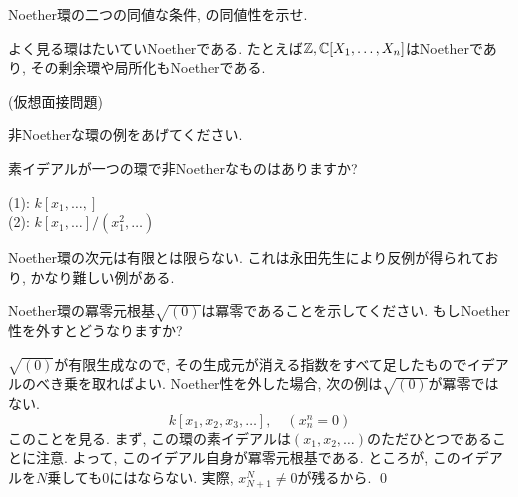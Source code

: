 \begin{prac}
Noether環の二つの同値な条件, の同値性を示せ.
\end{prac}

\begin{eg}
よく見る環はたいていNoetherである. たとえば$\mathbb{Z}, \mathbb{C}[X_1,\dots,X_n]$はNoetherであり, その剰余環や局所化もNoetherである.
\end{eg}

\begin{egprob} (仮想面接問題)
\ben
\item 非Noetherな環の例をあげてください.
\item 素イデアルが一つの環で非Noetherなものはありますか?
\een
\end{egprob}
\begin{egans}
(1): $k[x_1,\dots, ]$ \\
(2): $k[x_1,\dots]/(x_1^2,\dots)$
\end{egans}


\begin{rem}
Noether環の次元は有限とは限らない.  これは永田先生により反例が得られており, かなり難しい例がある.
\end{rem}

\begin{egprob}
Noether環の冪零元根基$\sqrt{(0)}$は冪零であることを示してください. もしNoether性を外すとどうなりますか?
\end{egprob}
\begin{egans}
$\sqrt{(0)}$が有限生成なので, その生成元が消える指数をすべて足したものでイデアルのべき乗を取ればよい. Noether性を外した場合, 次の例は$\sqrt{(0)}$が冪零ではない.
\[k[x_1,x_2,x_3,\dots],\quad (x_n^{n} = 0)\]
このことを見る. まず, この環の素イデアルは$(x_1,x_2,\dots)$のただひとつであることに注意. よって, このイデアル自身が冪零元根基である. ところが, このイデアルを$N$乗しても0にはならない. 実際, $x_{N+1}^{N}\neq 0$が残るから. \qed
\end{egans}


